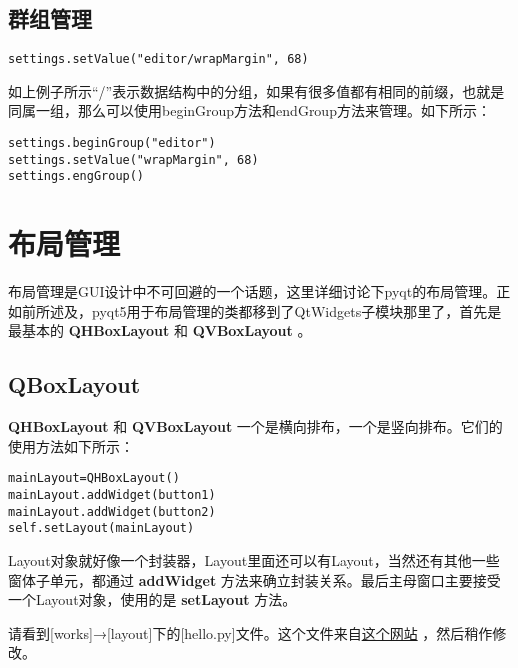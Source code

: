 \documentclass[11pt,oneside]{article}
\begin{document}
\subsection{群组管理}
\label{sec:orgheadline31}
\begin{Verbatim}
settings.setValue("editor/wrapMargin", 68)
\end{Verbatim}

如上例子所示“/”表示数据结构中的分组，如果有很多值都有相同的前缀，也就是同属一组，那么可以使用beginGroup方法和endGroup方法来管理。如下所示：

\begin{Verbatim}
settings.beginGroup("editor")
settings.setValue("wrapMargin", 68)
settings.engGroup()
\end{Verbatim}



\section{布局管理}
\label{sec:orgheadline37}
布局管理是GUI设计中不可回避的一个话题，这里详细讨论下pyqt的布局管理。正如前所述及，pyqt5用于布局管理的类都移到了QtWidgets子模块那里了，首先是最基本的 \textbf{QHBoxLayout} 和 \textbf{QVBoxLayout} 。

\subsection{QBoxLayout}
\label{sec:orgheadline33}
\textbf{QHBoxLayout} 和 \textbf{QVBoxLayout} 一个是横向排布，一个是竖向排布。它们的使用方法如下所示：

\begin{Verbatim}
mainLayout=QHBoxLayout()
mainLayout.addWidget(button1)
mainLayout.addWidget(button2)
self.setLayout(mainLayout)
\end{Verbatim}


Layout对象就好像一个封装器，Layout里面还可以有Layout，当然还有其他一些窗体子单元，都通过 \textbf{addWidget} 方法来确立封装关系。最后主母窗口主要接受一个Layout对象，使用的是 \textbf{setLayout} 方法。

请看到[works]→[layout]下的[hello.py]文件。这个文件来自\href{http://www.thehackeruniversity.com/2014/01/23/pyqt5-beginner-tutorial/}{这个网站} ，然后稍作修改。
\end{document}
